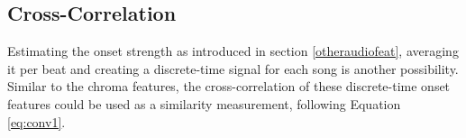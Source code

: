 \subsection{Cross-Correlation}

Estimating the onset strength as introduced in section \ref{otheraudiofeat}, averaging it per beat and creating a discrete-time signal for each song is another possibility. Similar to the chroma features, the cross-correlation of these discrete-time onset features could be used as a similarity measurement, following Equation \ref{eq:conv1}. 

\begin{figure}[htbp]
	\centering
\end{figure}
